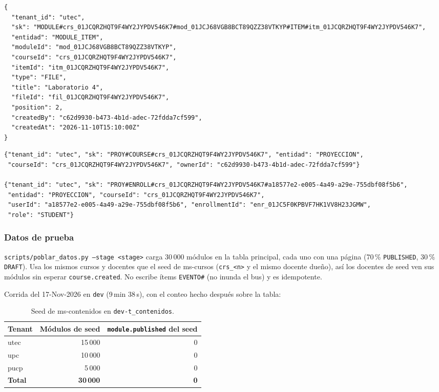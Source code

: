 \begin{lstlisting}[caption={Ítem de tipo archivo (\texttt{MODULE\#...\#ITEM\#}); una página lleva \texttt{body} y un enlace \texttt{url}}]
{
  "tenant_id": "utec",
  "sk": "MODULE#crs_01JCQRZHQT9F4WY2JYPDV546K7#mod_01JCJ68VGB8BCT89QZZ38VTKYP#ITEM#itm_01JCQRZHQT9F4WY2JYPDV546K7",
  "entidad": "MODULE_ITEM",
  "moduleId": "mod_01JCJ68VGB8BCT89QZZ38VTKYP",
  "courseId": "crs_01JCQRZHQT9F4WY2JYPDV546K7",
  "itemId": "itm_01JCQRZHQT9F4WY2JYPDV546K7",
  "type": "FILE",
  "title": "Laboratorio 4",
  "fileId": "fil_01JCQRZHQT9F4WY2JYPDV546K7",
  "position": 2,
  "createdBy": "c62d9930-b473-4b1d-adec-72fdda7cf599",
  "createdAt": "2026-11-10T15:10:00Z"
}
\end{lstlisting}

\begin{lstlisting}[caption={Proyecciones de ms-cursos (\texttt{PROY\#COURSE\#} y \texttt{PROY\#ENROLL\#})}]
{"tenant_id": "utec", "sk": "PROY#COURSE#crs_01JCQRZHQT9F4WY2JYPDV546K7", "entidad": "PROYECCION",
 "courseId": "crs_01JCQRZHQT9F4WY2JYPDV546K7", "ownerId": "c62d9930-b473-4b1d-adec-72fdda7cf599"}

{"tenant_id": "utec", "sk": "PROY#ENROLL#crs_01JCQRZHQT9F4WY2JYPDV546K7#a18577e2-e005-4a49-a29e-755dbf08f5b6",
 "entidad": "PROYECCION", "courseId": "crs_01JCQRZHQT9F4WY2JYPDV546K7",
 "userId": "a18577e2-e005-4a49-a29e-755dbf08f5b6", "enrollmentId": "enr_01JC5F0KPBVF7HK1VV8H23JGMW",
 "role": "STUDENT"}
\end{lstlisting}

\subsubsection{Datos de prueba}
\texttt{scripts/poblar\_datos.py --stage <stage>} carga 30\,000 módulos en la tabla principal, cada uno
con una página (70\,\% \texttt{PUBLISHED}, 30\,\% \texttt{DRAFT}). Usa los mismos cursos y docentes que el
seed de ms-cursos (\texttt{crs\_<n>} y el mismo docente dueño), así los docentes de seed ven sus módulos
sin esperar \texttt{course.created}. No escribe ítems \texttt{EVENTO\#} (no inunda el bus) y es
idempotente.

Corrida del 17-Nov-2026 en \texttt{dev} (9\,min 38\,s), con el conteo hecho después sobre la tabla:

\begin{table}[htbp]
\centering\small
\begin{tabular}{lrr}
\toprule
Tenant & Módulos de seed & \texttt{module.published} del seed \\
\midrule
utec & 15\,000 & 0 \\
upc  & 10\,000 & 0 \\
pucp &  5\,000 & 0 \\
\midrule
\textbf{Total} & \textbf{30\,000} & \textbf{0} \\
\bottomrule
\end{tabular}
\caption{Seed de ms-contenidos en \texttt{dev-t\_contenidos}.}
\end{table}

